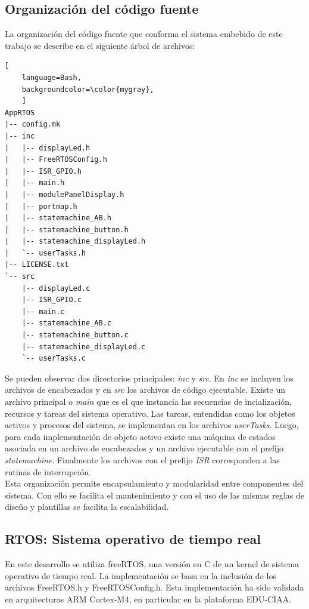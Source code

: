 \subsection{Organización del código fuente}
La organización del código fuente que conforma el sistema embebido de este trabajo se describe en el siguiente árbol de archivos:

\begin{lstlisting}[
	language=Bash, 
	backgroundcolor=\color{mygray},
	]
AppRTOS
|-- config.mk
|-- inc
|   |-- displayLed.h
|   |-- FreeRTOSConfig.h
|   |-- ISR_GPIO.h
|   |-- main.h
|   |-- modulePanelDisplay.h
|   |-- portmap.h
|   |-- statemachine_AB.h
|   |-- statemachine_button.h
|   |-- statemachine_displayLed.h
|   `-- userTasks.h
|-- LICENSE.txt
`-- src
    |-- displayLed.c
    |-- ISR_GPIO.c
    |-- main.c
    |-- statemachine_AB.c
    |-- statemachine_button.c
    |-- statemachine_displayLed.c
    `-- userTasks.c
\end{lstlisting}

Se pueden observar dos directorios principales: \textit{inc} y \textit{src}. En \textit{inc} se incluyen los archivos de encabezados y en \textit{src} los archivos de código ejecutable. Existe un archivo principal o \textit{main} que es el que instancia las secuencias de incialización, recursos y tareas del sistema operativo. Las tareas, entendidas como los objetos activos y procesos del sistema, se implementan en los archivos \textit{userTasks}. Luego, para cada implementación de objeto activo existe una máquina de estados asociada en un archivo de encabezados y un archivo ejecutable con el prefijo \textit{statemachine}. Finalmente los archivos con el prefijo \textit{ISR} corresponden a las rutinas de interrupción.\\

Esta organización permite encapsulamiento y modularidad entre componentes del sistema. Con ello se facilita el mantenimiento y con el uso de las mismas reglas de diseño y plantillas se facilita la escalabilidad.\\

\subsection{RTOS: Sistema operativo de tiempo real}

En este desarrollo se utiliza freeRTOS, una versión en C de un kernel de sistema operativo de tiempo real. La implementación se basa en la inclusión de los archivos FreeRTOS.h y FreeRTOSConfig.h. Esta implementación ha sido validada en arquitecturas ARM Cortex-M4, en particular en la plataforma EDU-CIAA. 

